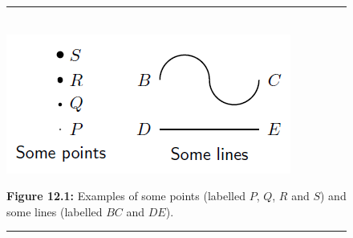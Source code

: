     \setcounter{subfigure}{0}


	\begin{figure}[H] %
    \begin{center}
    \rule[.1in]{\figurerulewidth}{.005in} \\
        \label{m39370*uid7!!!underscore!!!media}\label{m39370*uid7!!!underscore!!!printimage}\includegraphics{col11306.imgs/m39370_MG10C13_001.png} %
        
      \vspace{2pt}
    \vspace{\rubberspace}\par \begin{cnxcaption}
	  \small \textbf{Figure 12.1: }Examples of some points (labelled \begin{math}P\end{math}, \begin{math}Q\end{math}, \begin{math}R\end{math} and \begin{math}S\end{math}\hspace{1ex}) and some lines (labelled \begin{math}BC\end{math} and \begin{math}DE\end{math}\hspace{1ex}).
	\end{cnxcaption}
      
    \vspace{.1in}
    \rule[.1in]{\figurerulewidth}{.005in} \\
        
    \end{center}

 \end{figure}   

    \addtocounter{footnote}{-0}
    
